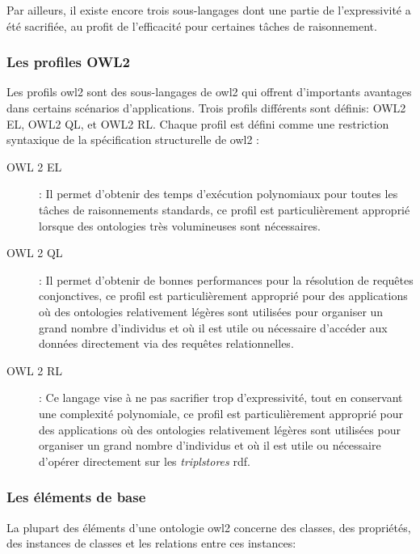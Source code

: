 Par ailleurs, il existe encore trois sous-langages dont une partie de
l'expressivité a été sacrifiée, au profit de l'efficacité pour
certaines tâches de raisonnement.

\subsubsection{Les profiles OWL2}
\label{sec:semantic-web-owl-owl2-profiles}

Les profils \acrshort{owl2} \cite{motik2009owl} sont des sous-langages
de \acrshort{owl2} qui offrent d'importants avantages dans certains
scénarios d'applications. Trois profils différents sont définis:
\textsf{OWL2 EL}, \textsf{OWL2 QL}, et \textsf{ OWL2 RL}. Chaque
profil est défini comme une restriction syntaxique de la spécification
structurelle de \acrshort{owl2} \cite{w3c2009owl}:


\renewcommand{\descriptionlabel}[1]{\hspace{0.5cm}\textbullet~\textsf{#1}}
\begin{description}
\item[OWL 2 EL]: Il permet d'obtenir des temps d'exécution polynomiaux
  pour toutes les tâches de raisonnements standards, ce profil est
  particulièrement approprié lorsque des ontologies très volumineuses
  sont nécessaires.

\item[OWL 2 QL]: Il permet d'obtenir de bonnes performances pour la
  résolution de requêtes conjonctives, ce profil est particulièrement
  approprié pour des applications où des ontologies relativement
  légères sont utilisées pour organiser un grand nombre d'individus et
  où il est utile ou nécessaire d'accéder aux données directement via
  des requêtes relationnelles.

\item[ OWL 2 RL]: Ce langage vise à ne pas sacrifier trop
  d'expressivité, tout en conservant une complexité polynomiale, ce
  profil est particulièrement approprié pour des applications où des
  ontologies relativement légères sont utilisées pour organiser un
  grand nombre d'individus et où il est utile ou nécessaire d'opérer
  directement sur les \textit{triplstores} \acrshort{rdf}.
\end{description}
\enddescription

\subsubsection{Les éléments de base}
\label{sec:semantic-web-owl-owl2-elements}

La plupart des éléments d'une ontologie \acrshort{owl2} concerne des
classes, des propriétés, des instances de classes et les relations
entre ces instances:

\newpage
